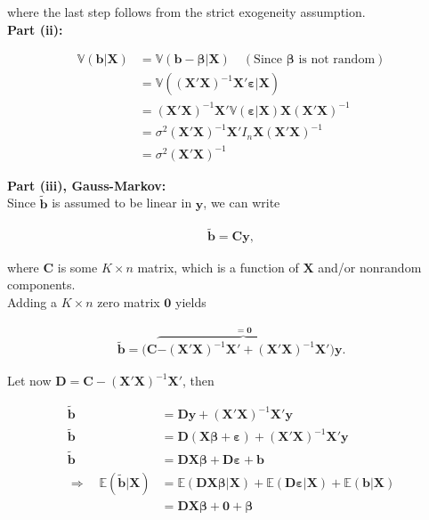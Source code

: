 \documentclass[]{book}
\theoremstyle{definition}
\theoremstyle{definition}
\theoremstyle{definition}
\theoremstyle{remark}
\begin{document}
where the last step follows from the strict exogeneity assumption.\\
\textbf{Part (ii):}

\[
\begin{align*}
\mathbb{V}(\mathbf{b}|\mathbf{X})
  &=\mathbb{V}(\mathbf{b}-\boldsymbol{\beta}|\mathbf{X})\quad\left(\text{Since $\boldsymbol{\beta}$ is not random}\right)\\
  &=\mathbb{V}\left(\left(\mathbf{X}'\mathbf{X}\right)^{-1}\mathbf{X}'\boldsymbol{\varepsilon}|\mathbf{X}\right)\\
  &=\left(\mathbf{X}'\mathbf{X}\right)^{-1}\mathbf{X}'\mathbb{V}\left(\boldsymbol{\varepsilon}|\mathbf{X}\right)\mathbf{X}\left(\mathbf{X}'\mathbf{X}\right)^{-1}\\
  &=\sigma^2\left(\mathbf{X}'\mathbf{X}\right)^{-1}\mathbf{X}'I_n\mathbf{X}\left(\mathbf{X}'\mathbf{X}\right)^{-1}\\
  &=\sigma^2\left(\mathbf{X}'\mathbf{X}\right)^{-1}
\end{align*}
\]

\textbf{Part (iii),
Gauss-Markov:}\\
Since \(\tilde{\mathbf{b}}\) is assumed to be linear in \(\mathbf{y}\), we can
write

\[
\begin{align*}
\tilde{\mathbf{b}}=\mathbf{C}\mathbf{y},
\end{align*}
\]

where \(\mathbf{C}\) is
some \(K\times n\) matrix, which is a function of \(\mathbf{X}\) and/or nonrandom
components.\\
Adding a \(K\times n\) zero matrix \(\mathbf{0}\) yields

\[
\begin{align*}
\tilde{\mathbf{b}}=\Big(\mathbf{C}\overbrace{-\left(\mathbf{X}'\mathbf{X}\right)^{-1}\mathbf{X}'+\left(\mathbf{X}'\mathbf{X}\right)^{-1}\mathbf{X}'}^{=\mathbf{0}}\Big)\mathbf{y}.
\end{align*}
\]

Let now \(\mathbf{D}=\mathbf{C}-\left(\mathbf{X}'\mathbf{X}\right)^{-1}\mathbf{X}'\), then

\[
\begin{align*}
\tilde{\mathbf{b}}&=\mathbf{D}\mathbf{y} + \left(\mathbf{X}'\mathbf{X}\right)^{-1}\mathbf{X}'\mathbf{y}\nonumber\\
\tilde{\mathbf{b}}&=\mathbf{D}\left(\mathbf{X}\boldsymbol{\beta}+\boldsymbol{\varepsilon}\right) + \left(\mathbf{X}'\mathbf{X}\right)^{-1}\mathbf{X}'\mathbf{y}\nonumber\\
\tilde{\mathbf{b}}&=\mathbf{D}\mathbf{X}\boldsymbol{\beta}+\mathbf{D}\boldsymbol{\varepsilon} + \mathbf{b}
\label{eq:c3e16}\\[2ex]
\Rightarrow\quad\mathbb{E}(\tilde{\mathbf{b}}|\mathbf{X})&=\mathbb{E}(\mathbf{D}\mathbf{X}\boldsymbol{\beta}|\mathbf{X})+\mathbb{E}(\mathbf{D}\boldsymbol{\varepsilon}|\mathbf{X})+\mathbb{E}(\mathbf{b}|\mathbf{X})\nonumber\\
&=\mathbf{D}\mathbf{X}\boldsymbol{\beta}+\mathbf{0}+\boldsymbol{\beta}
\label{eq:c3e17}
\end{align*}
\]
\end{document}
